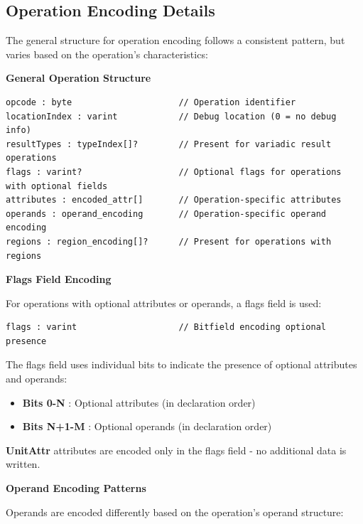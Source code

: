 \documentclass{article}
\begin{document}
\subsection{Operation Encoding Details}

The general structure for operation encoding follows a consistent pattern, but varies based on the operation's characteristics:


\textbf{General Operation Structure}


\begin{lstlisting}
opcode : byte                     // Operation identifier
locationIndex : varint            // Debug location (0 = no debug info)
resultTypes : typeIndex[]?        // Present for variadic result operations
flags : varint?                   // Optional flags for operations with optional fields
attributes : encoded_attr[]       // Operation-specific attributes
operands : operand_encoding       // Operation-specific operand encoding
regions : region_encoding[]?      // Present for operations with regions
\end{lstlisting}

\textbf{Flags Field Encoding}


For operations with optional attributes or operands, a flags field is used:


\begin{lstlisting}
flags : varint                    // Bitfield encoding optional presence
\end{lstlisting}

The flags field uses individual bits to indicate the presence of optional attributes and operands:


\begin{itemize}
\item \textbf{Bits 0-N} : Optional attributes (in declaration order)
\item \textbf{Bits N+1-M} : Optional operands (in declaration order)

\end{itemize}
\textbf{UnitAttr} attributes are encoded only in the flags field - no additional data is written.


\textbf{Operand Encoding Patterns}


Operands are encoded differently based on the operation's operand structure:
\end{document}
